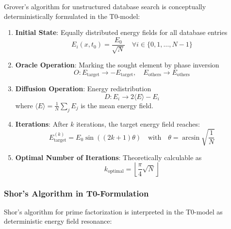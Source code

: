 \documentclass[12pt,a4paper]{article}
\theoremstyle{definition}
\begin{document}
	Grover's algorithm for unstructured database search is conceptually deterministically formulated in the T0-model:
	
	\begin{enumerate}
		\item \textbf{Initial State}: Equally distributed energy fields for all database entries
		\begin{equation}
			E_i(x,t_0) = \frac{E_0}{\sqrt{N}} \quad \forall i \in \{0,1,\ldots,N-1\}
		\end{equation}
		
		\item \textbf{Oracle Operation}: Marking the sought element by phase inversion
		\begin{equation}
			O: E_{\text{target}} \rightarrow -E_{\text{target}}, \quad E_{\text{others}} \rightarrow E_{\text{others}}
		\end{equation}
		
		\item \textbf{Diffusion Operation}: Energy redistribution
		\begin{equation}
			D: E_i \rightarrow 2\langle E \rangle - E_i
		\end{equation}
		where $\langle E \rangle = \frac{1}{N}\sum_j E_j$ is the mean energy field.
		
		\item \textbf{Iterations}: After $k$ iterations, the target energy field reaches:
		\begin{equation}
			E_{\text{target}}^{(k)} = E_0 \sin\left((2k+1)\theta\right) \quad \text{with} \quad \theta = \arcsin\sqrt{\frac{1}{N}}
		\end{equation}
		
		\item \textbf{Optimal Number of Iterations}: Theoretically calculable as
		\begin{equation}
			k_{\text{optimal}} = \left\lfloor\frac{\pi}{4}\sqrt{N}\right\rfloor
		\end{equation}
	\end{enumerate}
	
	\subsubsection{Shor's Algorithm in T0-Formulation}
	
	Shor's algorithm for prime factorization is interpreted in the T0-model as deterministic energy field resonance:
	
\end{document}
